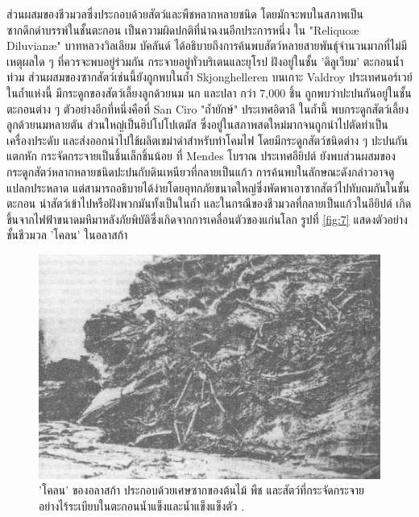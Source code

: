 \documentclass[10pt,twocolumn,letterpaper]{article}
\begin{document}
ส่วนผสมของชีวมวลซึ่งประกอบด้วยสัตว์และพืชหลากหลายชนิด โดยมักจะพบในสภาพเป็นซากดึกดำบรรพ์ในชั้นตะกอน เป็นความผิดปกติที่น่าฉงนอีกประการหนึ่ง ใน "Reliquoæ Diluvianæ" บาทหลวงวิลเลียม บัคลันด์ ได้อธิบายถึงการค้นพบสัตว์หลายสายพันธุ์จำนวนมากที่ไม่มีเหตุผลใด ๆ ที่ควรจะพบอยู่ร่วมกัน กระจายอยู่ทั่วบริเตนและยุโรป ฝังอยู่ในชั้น 'ดิลูเวียม' ตะกอนน้ำท่วม \cite{58} ส่วนผสมของซากสัตว์เช่นนี้ยังถูกพบในถ้ำ Skjonghelleren บนเกาะ Valdroy ประเทศนอร์เวย์ ในถ้ำแห่งนี้ มีกระดูกของสัตว์เลี้ยงลูกด้วยนม นก และปลา กว่า 7,000 ชิ้น ถูกพบว่าปะปนกันอยู่ในชั้นตะกอนต่าง ๆ \cite{59} ตัวอย่างอีกที่หนึ่งคือที่ San Ciro "ถ้ำยักษ์" ประเทศอิตาลี ในถ้ำนี้ พบกระดูกสัตว์เลี้ยงลูกด้วยนมหลายตัน ส่วนใหญ่เป็นฮิปโปโปเตมัส ซึ่งอยู่ในสภาพสดใหม่มากจนถูกนำไปตัดทำเป็นเครื่องประดับ และส่งออกนำไปใช้ผลิตเขม่าดำสำหรับทำโคมไฟ โดยมีกระดูกสัตว์ชนิดต่าง ๆ ปะปนกัน แตกหัก กระจัดกระจายเป็นชิ้นเล็กชิ้นน้อย \cite{60,61} ที่ Mendes โบราณ ประเทศอียิปต์ ยังพบส่วนผสมของกระดูกสัตว์หลากหลายชนิดปะปนกับดินเหนียวที่กลายเป็นแก้ว \cite{57} การค้นพบในลักษณะดังกล่าวอาจดูแปลกประหลาด แต่สามารถอธิบายได้ง่ายโดยอุทกภัยขนาดใหญ่ซึ่งพัดพาเอาซากสัตว์ไปทับถมกันในชั้นตะกอน นำสัตว์เข้าไปหรือฝังพวกมันทั้งเป็นในถ้ำ และในกรณีของชีวมวลที่กลายเป็นแก้วในอียิปต์ เกิดขึ้นจากไฟฟ้าขนาดมหึมาหลังภัยพิบัติซึ่งเกิดจากการเคลื่อนตัวของแก่นโลก รูปที่ \ref{fig:7} แสดงตัวอย่างชั้นชีวมวล 'โคลน' ในอลาสก้า \cite{56}

\begin{figure}[t]
\begin{center}
   \includegraphics[width=1\linewidth]{muck-crop.jpeg}
\end{center}
   \caption{'โคลน' ของอลาสก้า ประกอบด้วยเศษซากของต้นไม้ พืช และสัตว์ที่กระจัดกระจายอย่างไร้ระเบียบในตะกอนน้ำแข็งและน้ำแข็งแข็งตัว \cite{146}.}
\label{fig:7}
\label{fig:onecol}
\end{figure}
\end{document}
